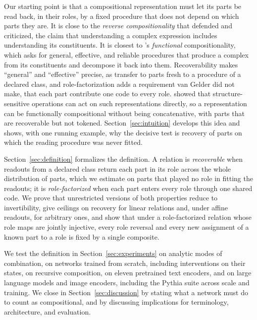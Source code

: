 \documentclass[10pt]{article}
\theoremstyle{plain}
\theoremstyle{remark}
\begin{document}
Our starting point is that a compositional representation must let its parts be read back, in their roles, by a fixed procedure that does not depend on which parts they are. It is close to the \emph{reverse compositionality} that \citet{fodor2002} defended and \citet{robbins2005} criticized, the claim that understanding a complex expression includes understanding its constituents. It is closest to \citet{vangelder1990}'s \emph{functional} compositionality, which asks for general, effective, and reliable procedures that produce a complex from its constituents and decompose it back into them. Recoverability makes ``general'' and ``effective'' precise, as transfer to parts fresh to a procedure of a declared class, and role-factorization adds a requirement van Gelder did not make, that each part contribute one code to every role. \citet{chalmers1990} showed that structure-sensitive operations can act on such representations directly, so a representation can be functionally compositional without being concatenative, with parts that are recoverable but not tokened. Section~\ref{sec:intuition} develops this idea and shows, with one running example, why the decisive test is recovery of parts on which the reading procedure was never fitted.

Section~\ref{sec:definition} formalizes the definition. A relation is \emph{recoverable} when readouts from a declared class return each part in its role across the whole distribution of parts, which we estimate on parts that played no role in fitting the readouts; it is \emph{role-factorized} when each part enters every role through one shared code. We prove that unrestricted versions of both properties reduce to invertibility, give ceilings on recovery for linear relations and, under affine readouts, for arbitrary ones, and show that under a role-factorized relation whose role maps are jointly injective, every role reversal and every new assignment of a known part to a role is fixed by a single composite.

We test the definition in Section~\ref{sec:experiments} on analytic modes of combination, on networks trained from scratch, including interventions on their states, on recursive composition, on eleven pretrained text encoders, and on large language models and image encoders, including the Pythia suite across scale and training. We close in Section~\ref{sec:discussion} by stating what a network must do to count as compositional, and by discussing implications for terminology, architecture, and evaluation.
\end{document}
